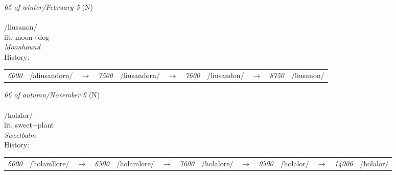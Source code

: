 \vspace{15pt}
\begin{nopagebreak}
 \textit{65 of winter/February 5} (N)\\
\\
\noindent /lius{\textprimstress}anon/\\
\noindent lit. moon+dog\\
\noindent \textit{Moonhound}\\


\noindent History:

\vspace{-0pt}
\hspace{40pt}
\begin{tabular}{ccc}
\textit{6000} & /aliusandorn/&$\rightarrow$ & \textit{7500} & /liusandorn/&$\rightarrow$ & \textit{7600} & /liusandon/&$\rightarrow$ & \textit{8750} & /liusanon/& \\
\end{tabular}

\vspace{20pt}\hline

\end{nopagebreak}
\filbreak



\vspace{15pt}
\begin{nopagebreak}
 \textit{66 of autumn/November 6} (N)\\
\\
\noindent /ħol{\textprimstress}alor/\\
\noindent lit. sweet+plant\\
\noindent \textit{Sweetbalm}\\


\noindent History:

\vspace{-0pt}
\hspace{40pt}
\begin{tabular}{ccc}
\textit{6000} & /holamllore/&$\rightarrow$ & \textit{6500} & /holamlore/&$\rightarrow$ & \textit{7600} & /holalore/&$\rightarrow$ & \textit{9500} & /holalor/&$\rightarrow$ & \textit{14006} & /ħolalor/& \\
\end{tabular}

\vspace{20pt}\hline

\end{nopagebreak}
\filbreak



